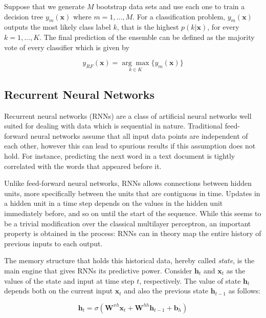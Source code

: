 \documentclass{kththesis}
\begin{document}
Suppose that we generate $M$ bootstrap data sets and use each one to train a decision tree $y_m(\mathbf{x})$ where $m=1,...,M$. For a classification problem, $y_m(\mathbf{x})$ outputs the most likely class label $k$, that is the highest $p(k|\mathbf{x})$, for every $k=1,...,K$. The final prediction of the ensemble can be defined as the majority vote of every classifier which is given by

\begin{equation}
y_\textit{RF}(\mathbf{x}) = \underset{k \in K}{\arg\max} \{y_m(\mathbf{x})\}
\end{equation}

\subsection{Recurrent Neural Networks}

Recurrent neural networks (RNNs) are a class of artificial neural networks well suited for dealing with data which is sequential in nature. Traditional feed-forward neural networks assume that all input data points are independent of each other, however this can lead to spurious results if this assumption does not hold. For instance, predicting the next word in a text document is tightly correlated with the words that appeared before it. 

Unlike feed-forward neural networks, RNNs allows connections between hidden units, more specifically between the units that are contiguous in time. Updates in a hidden unit in a time step depends on the values in the hidden unit immediately before, and so on until the start of the sequence. While this seems to be a trivial modification over the classical multilayer perceptron, an important property is obtained in the process: RNNs can in theory map the entire history of previous inputs to each output. 

The memory structure that holds this historical data, hereby called \emph{state}, is the main engine that gives RNNs its predictive power. Consider $\mathbf{h}_t$ and $\mathbf{x}_t$ as the values of the state and input at time step $t$, respectively. The value of state $\mathbf{h}_t$ depends both on the current input $\mathbf{x}_t$ and also the previous state $\mathbf{h}_{t-1}$ as follows:

\begin{equation}
\mathbf{h}_t = \sigma(\mathbf{W}^{xh}\mathbf{x}_t + \mathbf{W}^{hh}\mathbf{h}_{t-1} + \mathbf{b}_h)
\end{equation}
\end{document}
